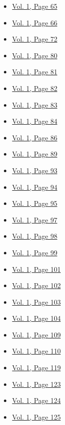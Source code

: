 \begin{itemize}
\begin{itemize}
  \item
    \protect\hyperlink{g-page-73}{Vol. 1, Page 65}
  \item
    \protect\hyperlink{g-page-74}{Vol. 1, Page 66}
  \item
    \protect\hyperlink{g-page-80}{Vol. 1, Page 72}
  \item
    \protect\hyperlink{g-page-88}{Vol. 1, Page 80}
  \item
    \protect\hyperlink{g-page-89}{Vol. 1, Page 81}
  \item
    \protect\hyperlink{g-page-90}{Vol. 1, Page 82}
  \item
    \protect\hyperlink{g-page-91}{Vol. 1, Page 83}
  \item
    \protect\hyperlink{g-page-92}{Vol. 1, Page 84}
  \item
    \protect\hyperlink{g-page-94}{Vol. 1, Page 86}
  \item
    \protect\hyperlink{g-page-97}{Vol. 1, Page 89}
  \item
    \protect\hyperlink{g-page-101}{Vol. 1, Page 93}
  \item
    \protect\hyperlink{g-page-102}{Vol. 1, Page 94}
  \item
    \protect\hyperlink{g-page-103}{Vol. 1, Page 95}
  \item
    \protect\hyperlink{g-page-105}{Vol. 1, Page 97}
  \item
    \protect\hyperlink{g-page-106}{Vol. 1, Page 98}
  \item
    \protect\hyperlink{g-page-107}{Vol. 1, Page 99}
  \item
    \protect\hyperlink{g-page-109}{Vol. 1, Page 101}
  \item
    \protect\hyperlink{g-page-110}{Vol. 1, Page 102}
  \item
    \protect\hyperlink{g-page-111}{Vol. 1, Page 103}
  \item
    \protect\hyperlink{g-page-112}{Vol. 1, Page 104}
  \item
    \protect\hyperlink{g-page-117}{Vol. 1, Page 109}
  \item
    \protect\hyperlink{g-page-118}{Vol. 1, Page 110}
  \item
    \protect\hyperlink{g-page-127}{Vol. 1, Page 119}
  \item
    \protect\hyperlink{g-page-131}{Vol. 1, Page 123}
  \item
    \protect\hyperlink{g-page-132}{Vol. 1, Page 124}
  \item
    \protect\hyperlink{g-page-133}{Vol. 1, Page 125}

\end{itemize}
\end{itemize}
